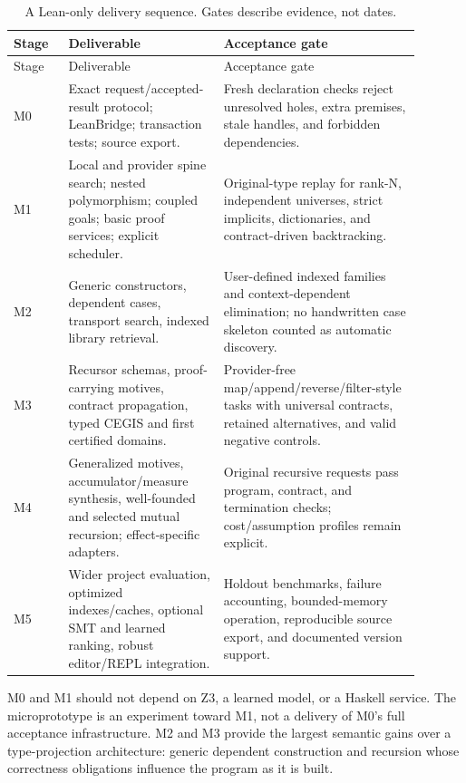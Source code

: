 \begin{longtable}{@{}L{0.12\linewidth}L{0.34\linewidth}L{0.43\linewidth}@{}}
\caption{A Lean-only delivery sequence. Gates describe evidence, not dates.}\\
\toprule
Stage & Deliverable & Acceptance gate \\
\midrule
\endfirsthead
\toprule Stage & Deliverable & Acceptance gate \\\midrule
\endhead
\bottomrule\endfoot
M0 & Exact request/accepted-result protocol; LeanBridge; transaction tests; source export. & Fresh declaration checks reject unresolved holes, extra premises, stale handles, and forbidden dependencies. \\
M1 & Local and provider spine search; nested polymorphism; coupled goals; basic proof services; explicit scheduler. & Original-type replay for rank-N, independent universes, strict implicits, dictionaries, and contract-driven backtracking. \\
M2 & Generic constructors, dependent cases, transport search, indexed library retrieval. & User-defined indexed families and context-dependent elimination; no handwritten case skeleton counted as automatic discovery. \\
M3 & Recursor schemas, proof-carrying motives, contract propagation, typed CEGIS and first certified domains. & Provider-free map/append/reverse/filter-style tasks with universal contracts, retained alternatives, and valid negative controls. \\
M4 & Generalized motives, accumulator/measure synthesis, well-founded and selected mutual recursion; effect-specific adapters. & Original recursive requests pass program, contract, and termination checks; cost/assumption profiles remain explicit. \\
M5 & Wider project evaluation, optimized indexes/caches, optional SMT and learned ranking, robust editor/REPL integration. & Holdout benchmarks, failure accounting, bounded-memory operation, reproducible source export, and documented version support. \\
\end{longtable}

M0 and M1 should not depend on Z3, a learned model, or a Haskell service. The
microprototype is an experiment toward M1, not a delivery of M0's full
acceptance infrastructure. M2 and M3 provide the largest semantic gains over a
type-projection architecture: generic dependent construction and recursion
whose correctness obligations influence the program as it is built.

